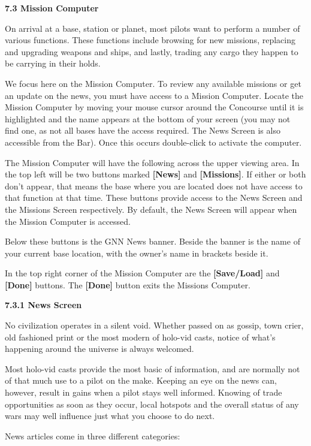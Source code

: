 \documentclass{article}
\begin{document}
\textbf{7.3 Mission Computer }

On arrival at a base, station or planet, most pilots want to perform a number of various functions. These functions include browsing for new missions, replacing and upgrading weapons and ships, and lastly, trading any cargo they happen to be carrying in their holds. 

We focus here on the Mission Computer. To review any available missions or get an update on the news, you must have access to a Mission Computer. Locate the Mission Computer by moving your mouse cursor around the Concourse until it is highlighted and the name appears at the bottom of your screen (you may not find one, as not all bases have the access required. The News Screen is also accessible from the Bar). Once this occurs double-click to activate the computer. 

The Mission Computer will have the following across the upper viewing area. In the top left will be two buttons marked \textbf{[News] }and \textbf{[Missions]}. If either or both don't appear, that means the base where you are located does not have access to that function at that time. These buttons provide access to the News Screen and the Missions Screen respectively. By default, the News Screen will appear when the Mission Computer is accessed. 

Below these buttons is the GNN News banner. Beside the banner is the name of your current base location, with the owner's name in brackets beside it. 

In the top right corner of the Mission Computer are the \textbf{[Save/Load] }and \textbf{[Done] }buttons. The \textbf{[Done] }button exits the Missions Computer. 

\textbf{7.3.1 News Screen}

No civilization operates in a silent void. Whether passed on as gossip, town crier, old fashioned print or the most modern of holo-vid casts, notice of what's happening around the universe is always welcomed. 

Most holo-vid casts provide the most basic of information, and are normally not of that much use to a pilot on the make. Keeping an eye on the news can, however, result in gains when a pilot stays well informed. Knowing of trade opportunities as soon as they occur, local hotspots and the overall status of any wars may well influence just what you choose to do next. 

News articles come in three different categories: 
\end{document}
